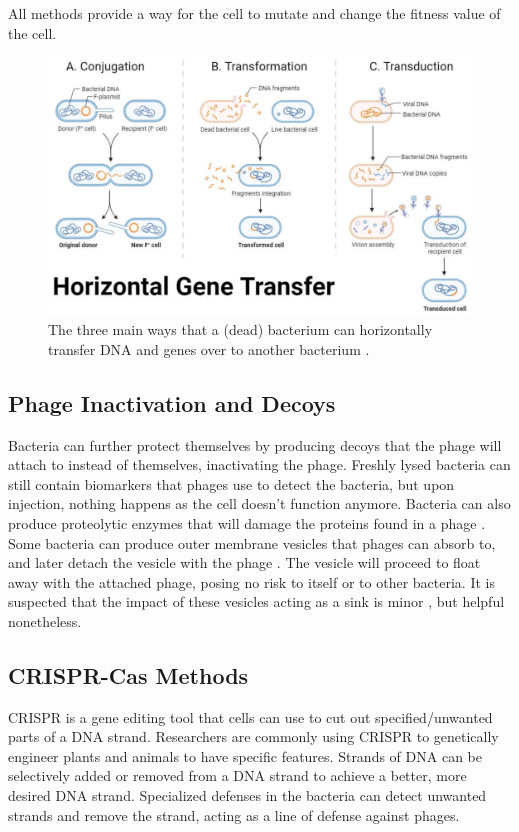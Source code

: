 All methods provide a way for the cell to mutate and change the fitness value of the cell.

\begin{figure}[h!]
    \centering
    \includegraphics[width=0.7\linewidth]{Figures/horizontal_gene_transfer.png}
    \caption{The three main ways that a (dead) bacterium can horizontally transfer DNA and genes over to another bacterium \cite{tamangHorizontalGeneTransfer2023}.}
    \label{fig:horizontal_gene_transfer}
\end{figure}

\subsection{Phage Inactivation and Decoys}
Bacteria can further protect themselves by producing decoys that the phage will attach to instead of themselves, inactivating the phage. 
Freshly lysed bacteria can still contain biomarkers that phages use to detect the bacteria, but upon injection, nothing happens as the cell doesn't function anymore. 
Bacteria can also produce proteolytic enzymes that will damage the proteins found in a phage \cite{tanQuorumSensingDetermines2015}. \newline
Some bacteria can produce outer membrane vesicles that phages can absorb to, and later detach the vesicle with the phage \cite{rabinovitchBacterialDebrisEcological2003}. 
The vesicle will proceed to float away with the attached phage, posing no risk to itself or to other bacteria. 
It is suspected that the impact of these vesicles acting as a sink is minor \cite{bullPhageBacterialDynamicsSpatial2018}, but helpful nonetheless. 


\subsection{CRISPR-Cas Methods}
CRISPR is a gene editing tool that cells can use to cut out specified/unwanted parts of a DNA strand. 
Researchers are commonly using CRISPR to genetically engineer plants and animals to have specific features. 
Strands of DNA can be selectively added or removed from a DNA strand to achieve a better, more desired DNA strand. 
Specialized defenses in the bacteria can detect unwanted strands and remove the strand, acting as a line of defense against phages. 

